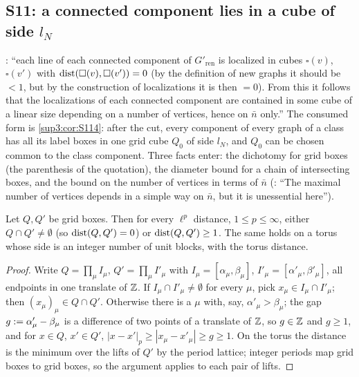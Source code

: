 
\subsection{S11: a connected component lies in a cube of side $l_N$}\label{sup3:ssec:S11}

\cite[p.~432]{Ba3}: ``each line of each connected component of $G'_{\mathrm{ren}}$ is localized in cubes $\square(v)$, $\square(v')$ with $\operatorname{dist}(\square(v),\square(v'))=0$ (by the definition of new graphs it should be $<1$, but by the construction of localizations it is then $=0$). From this it follows that the localizations of each connected component are contained in some cube of a linear size depending on a number of vertices, hence on $\bar n$ only.'' The consumed form is \cref{sup3:cor:S114}: after the cut, every component of every graph of a class has all its label boxes in one grid cube $Q_0$ of side $l_N$, and $Q_0$ can be chosen common to the class component. Three facts enter: the dichotomy for grid boxes (the parenthesis of the quotation), the diameter bound for a chain of intersecting boxes, and the bound on the number of vertices in terms of $\bar n$ (\cite[p.~414]{Ba3}: ``The maximal number of vertices depends in a simple way on $\bar n$, but it is unessential here'').

\begin{lemma}[the dichotomy ``$<1\Rightarrow=0$'']\label{sup3:lem:S111}
Let $Q,Q'$ be grid boxes. Then for every $\ell^p$ distance, $1\le p\le\infty$, either $Q\cap Q'\ne\emptyset$ (so $\operatorname{dist}(Q,Q')=0$) or $\operatorname{dist}(Q,Q')\ge1$. The same holds on a torus whose side is an integer number of unit blocks, with the torus distance.
\end{lemma}

\begin{proof}
Write $Q=\prod_\mu I_\mu$, $Q'=\prod_\mu I'_\mu$ with $I_\mu=[\alpha_\mu,\beta_\mu]$, $I'_\mu=[\alpha'_\mu,\beta'_\mu]$, all endpoints in one translate of $\mathbb Z$. If $I_\mu\cap I'_\mu\ne\emptyset$ for every $\mu$, pick $x_\mu\in I_\mu\cap I'_\mu$; then $(x_\mu)_\mu\in Q\cap Q'$. Otherwise there is a $\mu$ with, say, $\alpha'_\mu>\beta_\mu$; the gap $g:=\alpha'_\mu-\beta_\mu$ is a difference of two points of a translate of $\mathbb Z$, so $g\in\mathbb Z$ and $g\ge1$, and for $x\in Q$, $x'\in Q'$, $|x-x'|_p\ge|x_\mu-x'_\mu|\ge g\ge1$. On the torus the distance is the minimum over the lifts of $Q'$ by the period lattice; integer periods map grid boxes to grid boxes, so the argument applies to each pair of lifts.
\end{proof}

